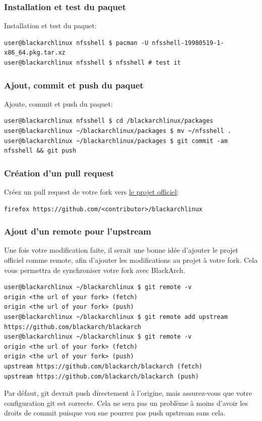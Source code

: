 \documentclass[a4paper, oneside, 11pt]{book}
\begin{document}
\subsubsection{Installation et test du paquet}
Installation et test du paquet:
{\small
\color{gray}
\begin{verbatim}
user@blackarchlinux nfsshell $ pacman -U nfsshell-19980519-1-x86_64.pkg.tar.xz
user@blackarchlinux nfsshell $ nfsshell # test it
\end{verbatim}
}

\subsubsection{Ajout, commit et push du paquet}
Ajoute, commit et push du paquet:
{\small
\color{gray}
\begin{verbatim}
user@blackarchlinux nfsshell $ cd /blackarchlinux/packages
user@blackarchlinux ~/blackarchlinux/packages $ mv ~/nfsshell .
user@blackarchlinux ~/blackarchlinux/packages $ git commit -am nfsshell && git push
\end{verbatim}
}

\subsubsection{Création d'un pull request}
Créez un pull request de votre fork vers
 \href{https://github.com/BlackArchLinux/blackarchlinux}{le projet officiel}:
{\small
\color{gray}
\begin{verbatim}
firefox https://github.com/<contributor>/blackarchlinux
\end{verbatim}
}

\subsubsection{Ajout d'un remote pour l'upstream}
Une fois votre modification faite, il serait une bonne idée d'ajouter le projet
officiel comme remote, afin d'ajouter les modifications au projet à votre fork.
Cela vous permettra de synchroniser votre fork avec BlackArch.
{\small
\color{gray}
\begin{verbatim}
user@blackarchlinux ~/blackarchlinux $ git remote -v
origin <the url of your fork> (fetch)
origin <the url of your fork> (push)
user@blackarchlinux ~/blackarchlinux $ git remote add upstream https://github.com/blackarch/blackarch
user@blackarchlinux ~/blackarchlinux $ git remote -v
origin <the url of your fork> (fetch)
origin <the url of your fork> (push)
upstream https://github.com/blackarch/blackarch (fetch)
upstream https://github.com/blackarch/blackarch (push)
\end{verbatim}
}
Par défaut, git devrait push directement à l'origine, mais assurez-vous que
votre configuration git est correcte. Cela ne sera pas un problème à moins
d'avoir les droits de commit puisque vou sne pourrez pas push upstream sans
cela.
\end{document}
